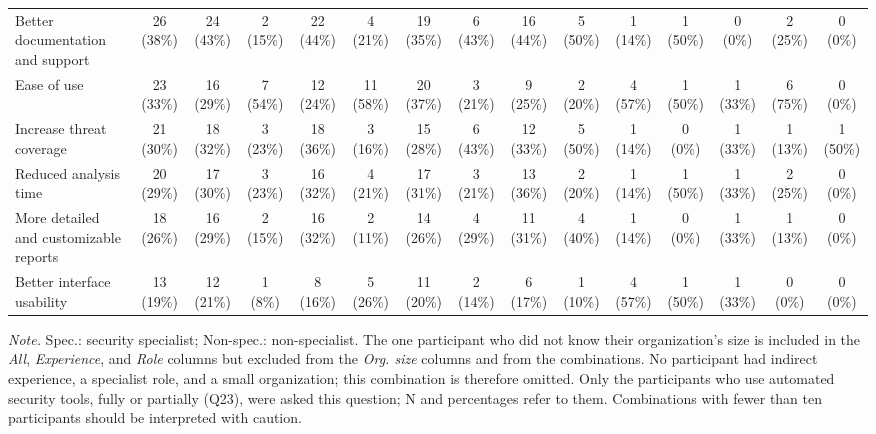\begin{table}[ht!]
{\begin{tabular}{@{}l c cc cc cccccc ccc@{}}
Better documentation and support & 26 (38\%) & 24 (43\%) & 2 (15\%) & 22 (44\%) & 4 (21\%) & 19 (35\%) & 6 (43\%) & 16 (44\%) & 5 (50\%) & 1 (14\%) & 1 (50\%) & 0 (0\%) & 2 (25\%) & 0 (0\%) \\
Ease of use & 23 (33\%) & 16 (29\%) & 7 (54\%) & 12 (24\%) & 11 (58\%) & 20 (37\%) & 3 (21\%) & 9 (25\%) & 2 (20\%) & 4 (57\%) & 1 (50\%) & 1 (33\%) & 6 (75\%) & 0 (0\%) \\
Increase threat coverage & 21 (30\%) & 18 (32\%) & 3 (23\%) & 18 (36\%) & 3 (16\%) & 15 (28\%) & 6 (43\%) & 12 (33\%) & 5 (50\%) & 1 (14\%) & 0 (0\%) & 1 (33\%) & 1 (13\%) & 1 (50\%) \\
Reduced analysis time & 20 (29\%) & 17 (30\%) & 3 (23\%) & 16 (32\%) & 4 (21\%) & 17 (31\%) & 3 (21\%) & 13 (36\%) & 2 (20\%) & 1 (14\%) & 1 (50\%) & 1 (33\%) & 2 (25\%) & 0 (0\%) \\
More detailed and customizable reports & 18 (26\%) & 16 (29\%) & 2 (15\%) & 16 (32\%) & 2 (11\%) & 14 (26\%) & 4 (29\%) & 11 (31\%) & 4 (40\%) & 1 (14\%) & 0 (0\%) & 1 (33\%) & 1 (13\%) & 0 (0\%) \\
Better interface usability & 13 (19\%) & 12 (21\%) & 1 (8\%) & 8 (16\%) & 5 (26\%) & 11 (20\%) & 2 (14\%) & 6 (17\%) & 1 (10\%) & 4 (57\%) & 1 (50\%) & 1 (33\%) & 0 (0\%) & 0 (0\%) \\
\bottomrule
\end{tabular}%
}

\vspace{2pt}
\begin{minipage}{0.98\textwidth}
\footnotesize
\textit{Note.} Spec.: security specialist; Non-spec.: non-specialist. The one participant who did not know their organization's size is included in the \textit{All}, \textit{Experience}, and \textit{Role} columns but excluded from the \textit{Org. size} columns and from the combinations. No participant had indirect experience, a specialist role, and a small organization; this combination is therefore omitted. Only the participants who use automated security tools, fully or partially (Q23), were asked this question; N and percentages refer to them. Combinations with fewer than ten participants should be interpreted with caution.
\end{minipage}
\end{table}
